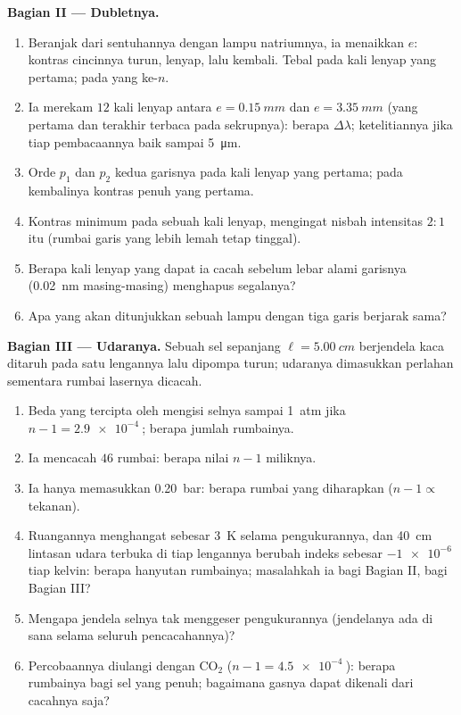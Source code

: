 \begin{problem}
\medskip
\noindent\textbf{Bagian II --- Dubletnya.}
\begin{enumerate}[resume]
  \item Beranjak dari sentuhannya dengan lampu natriumnya, ia menaikkan $e$:
        kontras cincinnya turun, lenyap, lalu kembali. Tebal pada
        kali lenyap yang pertama; pada yang ke-$n$.
  \item Ia merekam $12$ kali lenyap antara $e = \qty{0.15}{mm}$ dan
        $e = \qty{3.35}{mm}$ (yang pertama dan terakhir terbaca pada sekrupnya):
        berapa $\Delta\lambda$; ketelitiannya jika tiap pembacaannya baik sampai \qty{5}{\micro m}.
  \item Orde $p_1$ dan $p_2$ kedua garisnya pada kali lenyap yang
        pertama; pada kembalinya kontras penuh yang pertama.
  \item Kontras minimum pada sebuah kali lenyap, mengingat nisbah
        intensitas $2 : 1$ itu (rumbai garis yang lebih lemah tetap tinggal).
  \item Berapa kali lenyap yang dapat ia cacah sebelum lebar alami
        garisnya (\qty{0.02}{nm} masing-masing) menghapus segalanya?
  \item Apa yang akan ditunjukkan sebuah lampu dengan tiga garis berjarak sama?
\end{enumerate}

\medskip
\noindent\textbf{Bagian III --- Udaranya.}
Sebuah sel sepanjang $\ell = \qty{5.00}{cm}$ berjendela kaca ditaruh pada satu
lengannya lalu dipompa turun; udaranya dimasukkan perlahan sementara rumbai lasernya
dicacah.
\begin{enumerate}[resume]
  \item Beda  yang tercipta oleh mengisi selnya sampai
        \qty{1}{atm} jika $n - 1 = \qty{2.9e-4}{}$; berapa jumlah rumbainya.
  \item Ia mencacah $46$ rumbai: berapa nilai $n - 1$ miliknya.
  \item Ia hanya memasukkan \qty{0.20}{bar}: berapa rumbai yang diharapkan ($n - 1 \propto$
        tekanan).
  \item Ruangannya menghangat sebesar \qty{3}{K} selama pengukurannya, dan
        \qty{40}{cm} lintasan udara terbuka di tiap lengannya berubah indeks sebesar
        $-\qty{1e-6}{}$ tiap kelvin: berapa hanyutan rumbainya; masalahkah ia bagi
        Bagian II, bagi Bagian III?
  \item Mengapa jendela selnya tak menggeser pengukurannya (jendelanya
        ada di sana selama seluruh pencacahannya)?
  \item Percobaannya diulangi dengan CO$_2$ ($n - 1 = \qty{4.5e-4}{}$):
        berapa rumbainya bagi sel yang penuh; bagaimana gasnya dapat dikenali dari
        cacahnya saja?
\end{enumerate}


\end{problem}

